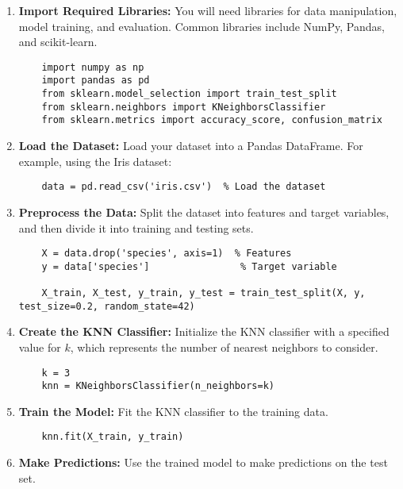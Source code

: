 \begin{enumerate}
    \item \textbf{Import Required Libraries:}
    You will need libraries for data manipulation, model training, and evaluation. Common libraries include NumPy, Pandas, and scikit-learn.

    \begin{verbatim}
    import numpy as np
    import pandas as pd
    from sklearn.model_selection import train_test_split
    from sklearn.neighbors import KNeighborsClassifier
    from sklearn.metrics import accuracy_score, confusion_matrix
    \end{verbatim}

    \item \textbf{Load the Dataset:}
    Load your dataset into a Pandas DataFrame. For example, using the Iris dataset:

    \begin{verbatim}
    data = pd.read_csv('iris.csv')  % Load the dataset
    \end{verbatim}

    \item \textbf{Preprocess the Data:}
    Split the dataset into features and target variables, and then divide it into training and testing sets.

    \begin{verbatim}
    X = data.drop('species', axis=1)  % Features
    y = data['species']                % Target variable

    X_train, X_test, y_train, y_test = train_test_split(X, y, test_size=0.2, random_state=42)
    \end{verbatim}

    \item \textbf{Create the KNN Classifier:}
    Initialize the KNN classifier with a specified value for \(k\), which represents the number of nearest neighbors to consider.

    \begin{verbatim}
    k = 3
    knn = KNeighborsClassifier(n_neighbors=k)
    \end{verbatim}

    \item \textbf{Train the Model:}
    Fit the KNN classifier to the training data.

    \begin{verbatim}
    knn.fit(X_train, y_train)
    \end{verbatim}

    \item \textbf{Make Predictions:}
    Use the trained model to make predictions on the test set.


\end{enumerate}

